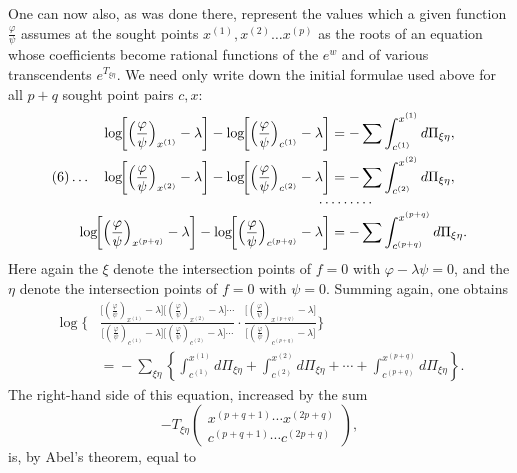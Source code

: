 \documentclass[10pt]{article}
\begin{document}
One can now also, as was done there, represent the values which a given function \(\frac{\varphi}{\psi}\) assumes at the sought points \(x^{(1)},x^{(2)}\ldots x^{(p)}\) as the roots of an equation whose coefficients become rational functions of the \(e^w\) and of various transcendents \(e^{T_{\xi\eta}}\). We need only write down the initial formulae used above for all \(p+q\) sought point pairs \(c,x\):
\begingroup\footnotesize
\[
\begin{aligned}
\log\!\biggl[\Bigl(\frac{\varphi}{\psi}\Bigr)_{x^{(1)}}-\lambda\biggr]
-\log\!\biggl[\Bigl(\frac{\varphi}{\psi}\Bigr)_{c^{(1)}}-\lambda\biggr]
&=-\sum\int_{c^{(1)}}^{x^{(1)}}d\Pi_{\xi\eta},\\
(6)\ldots\quad
\log\!\biggl[\Bigl(\frac{\varphi}{\psi}\Bigr)_{x^{(2)}}-\lambda\biggr]
-\log\!\biggl[\Bigl(\frac{\varphi}{\psi}\Bigr)_{c^{(2)}}-\lambda\biggr]
&=-\sum\int_{c^{(2)}}^{x^{(2)}}d\Pi_{\xi\eta},\\[-0.4em]
&\hspace{-1.0em}\cdots\cdots\cdots\\[-0.4em]
\log\!\biggl[\Bigl(\frac{\varphi}{\psi}\Bigr)_{x^{(p+q)}}-\lambda\biggr]
-\log\!\biggl[\Bigl(\frac{\varphi}{\psi}\Bigr)_{c^{(p+q)}}-\lambda\biggr]
&=-\sum\int_{c^{(p+q)}}^{x^{(p+q)}}d\Pi_{\xi\eta}.
\end{aligned}
\]
\endgroup
Here again the \(\xi\) denote the intersection points of \(f=0\) with \(\varphi-\lambda\psi=0\), and the \(\eta\) denote the intersection points of \(f=0\) with \(\psi=0\). Summing again, one obtains
\begingroup\footnotesize
\[
\begin{aligned}
\log\Biggl\{&
\frac{\bigl[(\frac{\varphi}{\psi})_{x^{(1)}}-\lambda\bigr]
\bigl[(\frac{\varphi}{\psi})_{x^{(2)}}-\lambda\bigr]\cdots}
{\bigl[(\frac{\varphi}{\psi})_{c^{(1)}}-\lambda\bigr]
\bigl[(\frac{\varphi}{\psi})_{c^{(2)}}-\lambda\bigr]\cdots}
\cdot
\frac{\bigl[(\frac{\varphi}{\psi})_{x^{(p+q)}}-\lambda\bigr]}
{\bigl[(\frac{\varphi}{\psi})_{c^{(p+q)}}-\lambda\bigr]}
\Biggr\}\\
&={} -\sum_{\xi\eta}\left\{\int_{c^{(1)}}^{x^{(1)}}d\Pi_{\xi\eta}+
\int_{c^{(2)}}^{x^{(2)}}d\Pi_{\xi\eta}+\cdots+
\int_{c^{(p+q)}}^{x^{(p+q)}}d\Pi_{\xi\eta}\right\}.
\end{aligned}
\]
\endgroup
The right-hand side of this equation, increased by the sum
\[
-T_{\xi\eta}\begin{pmatrix}x^{(p+q+1)}\cdots x^{(2p+q)}\\c^{(p+q+1)}\cdots c^{(2p+q)}\end{pmatrix},
\]
is, by Abel's theorem, equal to
\end{document}
